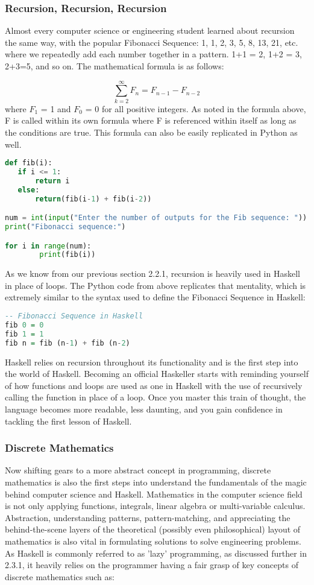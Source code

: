 \documentclass{article}
\begin{document}
\subsubsection{Recursion, Recursion, Recursion}
Almost every computer science or engineering student learned about recursion the same way, with the popular Fibonacci Sequence: 1, 1, 2, 3, 5, 8, 13, 21, etc. where we repeatedly add each number together in a pattern. 1+1 = 2, 1+2 = 3, 2+3=5, and so on. The mathematical formula is as follows:

\[ \sum_{k=2}^{\infty}F_{n}  = F_{n-1} - F_{n-2} \]
\noindent
where $F_{1}$ = 1 and $F_{0}$ = 0 for all positive integers. As noted in the formula above, F is called within its own formula where F is referenced within itself as long as the conditions are true. This formula can also be easily replicated in Python as well.

\begin{lstlisting}[language=Python]
def fib(i):
   if i <= 1:
       return i
   else:
       return(fib(i-1) + fib(i-2))

num = int(input("Enter the number of outputs for the Fib sequence: "))
print("Fibonacci sequence:")

for i in range(num):
        print(fib(i))
\end{lstlisting}
\noindent
As we know from our previous section 2.2.1, recursion is heavily used in Haskell in place of loops. The Python code from above replicates that mentality, which is extremely similar to the syntax used to define the Fibonacci Sequence in Haskell:

\begin{lstlisting}[language=haskell]
-- Fibonacci Sequence in Haskell
fib 0 = 0
fib 1 = 1
fib n = fib (n-1) + fib (n-2)
\end{lstlisting}
\noindent
Haskell relies on recursion throughout its functionality and is the first step into the world of Haskell. Becoming an official Haskeller starts with reminding yourself of how functions and loops are used as one in Haskell with the use of recursively calling the function in place of a loop. Once you master this train of thought, the language becomes more readable, less daunting, and you gain confidence in tackling the first lesson of Haskell.

\subsubsection{Discrete Mathematics}

Now shifting gears to a more abstract concept in programming, discrete mathematics is also the first steps into understand the fundamentals of the magic behind computer science and Haskell. Mathematics in the computer science field is not only applying functions, integrals, linear algebra or multi-variable calculus. Abstraction, understanding patterns, pattern-matching, and appreciating the behind-the-scene layers of the theoretical (possibly even philosophical) layout of mathematics is also vital in formulating solutions to solve engineering problems. As Haskell is commonly referred to as 'lazy' programming, as discussed further in 2.3.1, it heavily relies on the programmer having a fair grasp of key concepts of discrete mathematics such as:
\end{document}
